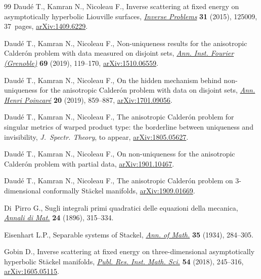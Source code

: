 \documentclass[11pt]{article}
\numberwithin{equation}{section}
\begin{document}
\begin{thebibliography}{99}
Daud\'e T., Kamran N., Nicoleau F., Inverse scattering at fixed energy on
 asymptotically hyperbolic {L}iouville surfaces, \href{https://doi.org/10.1088/0266-5611/31/12/125009}{\textit{Inverse Problems}}
 \textbf{31} (2015), 125009, 37~pages, \href{https://arxiv.org/abs/1409.6229}{arXiv:1409.6229}.

Daud\'e T., Kamran N., Nicoleau F., Non-uniqueness results for the
 anisotropic {C}alder\'{o}n problem with data measured on disjoint sets,
 \href{https://doi.org/10.5802/aif.3240}{\textit{Ann. Inst. Fourier (Grenoble)}} \textbf{69} (2019), 119--170,
 \href{https://arxiv.org/abs/1510.06559}{arXiv:1510.06559}.

Daud\'e T., Kamran N., Nicoleau F., On the hidden mechanism behind
 non-uniqueness for the anisotropic {C}alder\'{o}n problem with data on
 disjoint sets, \href{https://doi.org/10.1007/s00023-018-00755-2}{\textit{Ann. Henri Poincar\'e}} \textbf{20} (2019), 859--887,
 \href{https://arxiv.org/abs/1701.09056}{arXiv:1701.09056}.

Daud\'e T., Kamran N., Nicoleau F., The anisotropic {C}alder\'on problem for
 singular metrics of warped product type: the borderline between uniqueness
 and invisibility, \textit{J.~Spectr. Theory}, {t}o appear,
 \href{https://arxiv.org/abs/1805.05627}{arXiv:1805.05627}.

Daud\'e T., Kamran N., Nicoleau F., On non-uniqueness for the anisotropic
 {C}alder\'on problem with partial data, \href{https://arxiv.org/abs/1901.10467}{arXiv:1901.10467}.

Daud\'e T., Kamran N., Nicoleau F., The anisotropic Calder\'on problem on
 3-dimensional conformally {S}t\"ackel manifolds, \href{https://arxiv.org/abs/1909.01669}{arXiv:1909.01669}.

Di~Pirro G., Sugli integrali primi quadratici delle equazioni della mecanica,
 \href{https://doi.org/10.1007/BF02419532}{\textit{Annali di Mat.}} \textbf{24} (1896), 315--334.

Eisenhart L.P., Separable systems of {S}tackel, \href{https://doi.org/10.2307/1968433}{\textit{Ann. of Math.}}
 \textbf{35} (1934), 284--305.

Gobin D., Inverse scattering at fixed energy on three-dimensional
 asymptotically hyperbolic {S}t\"{a}ckel manifolds, \href{https://doi.org/10.4171/PRIMS/54-2-2}{\textit{Publ. Res. Inst.
 Math. Sci.}} \textbf{54} (2018), 245--316, \href{https://arxiv.org/abs/1605.05115}{arXiv:1605.05115}.


\end{thebibliography}
\end{document}
